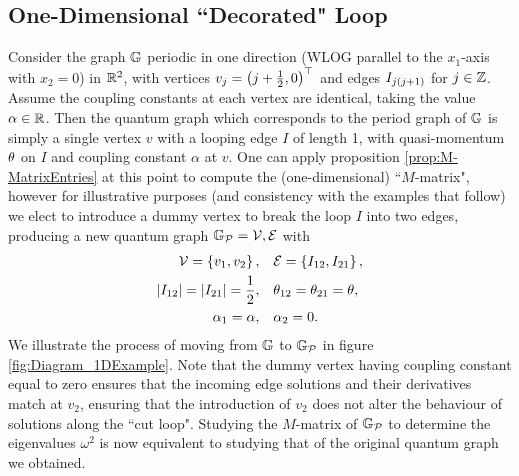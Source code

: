 \subsection{One-Dimensional ``Decorated" Loop} \label{ssec:Example1DLoop}
Consider the graph $\mathbb{G}$ periodic in one direction (WLOG parallel to the $x_1$-axis with $x_2=0$) in $\mathbb{R}^2$, with vertices $v_j = \left( j + \frac{1}{2}, 0 \right)^\top$ and edges $I_{j\left( j+1 \right)}$ for $j\in\mathbb{Z}$.
Assume the coupling constants at each vertex are identical, taking the value $\alpha\in\mathbb{R}$.
Then the quantum graph which corresponds to the period graph of $\mathbb{G}$ is simply a single vertex $v$ with a looping edge $I$ of length 1, with quasi-momentum $\theta$ on $I$ and coupling constant $\alpha$ at $v$. 
One can apply proposition \ref{prop:M-MatrixEntries} at this point to compute the (one-dimensional) ``$M$-matrix", however for illustrative purposes (and consistency with the examples that follow) we elect to introduce a dummy vertex to break the loop $I$ into two edges, producing a new quantum graph $\mathbb{G}_{\mathcal{P}}=\mathcal{\mathcal{V}, \mathcal{E}}$ with
\begin{align*}
	\mathcal{V} = \left\{  v_1 , v_2  \right\}, \quad &\mathcal{E} = \left\{  I_{12}, I_{21}  \right\}, \\
	\left\lvert I_{12} \right\rvert = \left\lvert I_{21} \right\rvert = \frac{1}{2}, \quad &\theta_{12} = \theta_{21} = \theta, \\
	\alpha_1 = \alpha, \quad &\alpha_2 = 0.
\end{align*}
We illustrate the process of moving from $\mathbb{G}$ to $\mathbb{G}_{\mathcal{P}}$ in figure \ref{fig:Diagram_1DExample}.
Note that the dummy vertex having coupling constant equal to zero ensures that the incoming edge solutions and their derivatives match at $v_2$, ensuring that the introduction of $v_2$ does not alter the behaviour of solutions along the ``cut loop".
Studying the $M$-matrix of $\mathbb{G}_{\mathcal{P}}$ to determine the eigenvalues $\omega^2$ is now equivalent to studying that of the original quantum graph we obtained.
